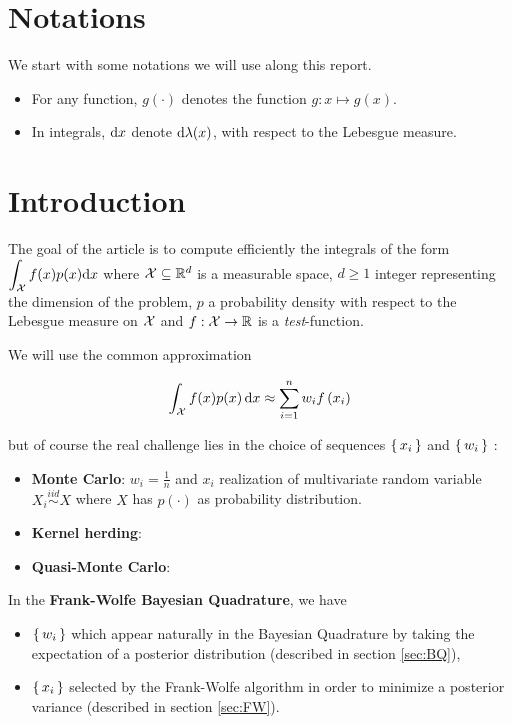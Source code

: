 \section*{Notations}
We start with some notations we will use along this report.
\begin{itemize}[font= \color{blue} \large, label= $\bullet$]
 \item For any function, $g(\cdot)$ denotes the function $g: x \mapsto g(x)$.
 \item In integrals, $\mathop{}\mathopen{}\mathrm{d} x$ denote $\mathop{}\mathopen{}\mathrm{d} \lambda(x)$, \ie with respect to the Lebesgue measure.
\end{itemize}

\section*{Introduction}

The goal of the article \cite{FWBQ} is to compute efficiently the integrals of the form
$ \displaystyle \int _ { \mathcal{X} } f ( x ) p ( x ) \mathrm { d } x$
where $\mathcal{X} \subseteq \mathbb{R} ^ { d }$ is a measurable space,
$d \geq 1$ integer representing the dimension of the problem, $p$ a probability
density with respect to the Lebesgue measure on $\mathcal{X}$ and $f : \mathcal{X} \rightarrow \mathbb{R}$
 is a \textit{test}-function.

 We will use the common approximation
 \begin{boxproblem}
   \begin{equation}
  \int _ { \mathcal{X} } f ( x ) p ( x ) \mathop{}\mathopen{}\mathrm{d} x \approx \sum _ { i = 1 } ^ { n } w _ { i } f \left( x _ { i } \right)
   \end{equation}
 \end{boxproblem}

 but of course the real challenge lies in the choice of sequences $\left \{ \, x_i \, \right \}$ and
 $\left \{ \, w_i \, \right \}$ :
  \begin{itemize}[font= \color{blue} \large, label= $\bullet$]
    \item \textbf{Monte Carlo}: $w_i = \frac{1}{n}$ and $x_i$ realization of multivariate
    random variable $X_i \stackrel{iid}{\sim} X$ where $X$ has $p(\cdot)$ as probability
    distribution.
    \item \textbf{Kernel herding}:
    \item \textbf{Quasi-Monte Carlo}:
  \end{itemize}

  In the \textbf{Frank-Wolfe Bayesian Quadrature}, we have
  \begin{itemize}[font= \color{blue} \large, label= ]
\item $\left \{ \, w_i \, \right \}$ which appear naturally in the Bayesian Quadrature by taking the expectation of a posterior distribution  (described in section \ref{sec:BQ}),
\item $\left \{ \, x_i \, \right \}$ selected by the Frank-Wolfe algorithm in order to minimize a posterior variance (described in section \ref{sec:FW}).
  \end{itemize}

